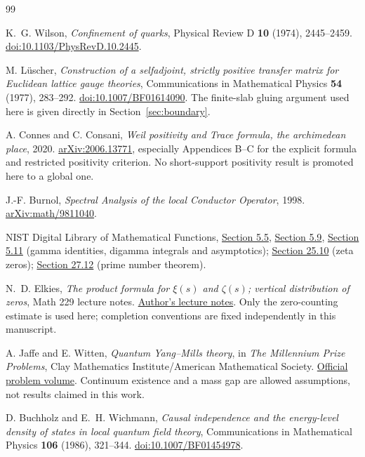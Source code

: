 \begin{thebibliography}{99}
K.~G. Wilson, \emph{Confinement of quarks},
Physical Review D \textbf{10} (1974), 2445--2459.
\href{https://doi.org/10.1103/PhysRevD.10.2445}{doi:10.1103/PhysRevD.10.2445}.

M. L\"uscher, \emph{Construction of a selfadjoint, strictly
positive transfer matrix for Euclidean lattice gauge theories},
Communications in Mathematical Physics \textbf{54} (1977), 283--292.
\href{https://doi.org/10.1007/BF01614090}{doi:10.1007/BF01614090}.
The finite-slab gluing argument used here is given directly
in Section~\ref{sec:boundary}.

A. Connes and C. Consani, \emph{Weil positivity and Trace
formula, the archimedean place}, 2020.
\href{https://arxiv.org/abs/2006.13771}{arXiv:2006.13771},
especially Appendices B--C for the explicit formula and
restricted positivity criterion. No short-support
positivity result is promoted here to a global one.

J.-F. Burnol, \emph{Spectral Analysis of the local Conductor
Operator}, 1998.
\href{https://arxiv.org/abs/math/9811040}{arXiv:math/9811040}.

NIST Digital Library of Mathematical Functions,
\href{https://dlmf.nist.gov/5.5}{Section 5.5},
\href{https://dlmf.nist.gov/5.9}{Section 5.9},
\href{https://dlmf.nist.gov/5.11}{Section 5.11}
(gamma identities, digamma integrals and asymptotics);
\href{https://dlmf.nist.gov/25.10}{Section 25.10}
(zeta zeros);
\href{https://dlmf.nist.gov/27.12}{Section 27.12}
(prime number theorem).

N.~D. Elkies, \emph{The product formula for $\xi(s)$ and
$\zeta(s)$; vertical distribution of zeros}, Math 229 lecture notes.
\href{https://people.math.harvard.edu/~elkies/M229.15/zeta2.pdf}{Author's lecture notes}.
Only the zero-counting estimate is used here; completion
conventions are fixed independently in this manuscript.

A. Jaffe and E. Witten, \emph{Quantum Yang--Mills theory},
in \emph{The Millennium Prize Problems}, Clay Mathematics
Institute/American Mathematical Society.
\href{https://www.claymath.org/library/monographs/MPPc.pdf}{Official problem volume}.
Continuum existence and a mass gap are allowed assumptions,
not results claimed in this work.

D. Buchholz and E.~H. Wichmann, \emph{Causal independence
and the energy-level density of states in local quantum
field theory}, Communications in Mathematical Physics
\textbf{106} (1986), 321--344.
\href{https://doi.org/10.1007/BF01454978}{doi:10.1007/BF01454978}.


\end{thebibliography}
